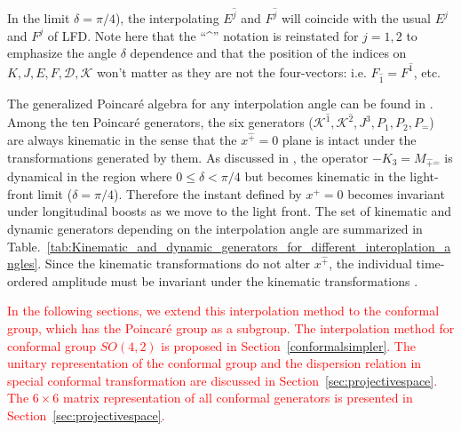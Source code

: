 \documentclass[journal,article,submit,pdftex,moreauthors]{Definitions/mdpi}
\newcommand{\pT}{\hat{+}}
\newcommand{\mT}{\hat{-}}
\newcommand{\itP}[1]{\hat{#1}}
\begin{document}
In the limit $\delta=\pi/4$), the interpolating $E^{\itP{j}}$ and $F^{\itP{j}}$ will coincide with the usual $E^{j}$ and $F^{j}$ of LFD.
Note here that the ``\textasciicircum'' notation is reinstated for $j=1, 2$ to emphasize the angle $\delta$ dependence and that the position of the indices on $K, J, E, F, \mathcal{D}, \mathcal{K}$ won't matter as they are not the four-vectors: i.e. $F_{\itP{1}}=F^{\itP{1}}$, etc.

The generalized Poincar\'e algebra for any interpolation angle can be found in \cite{Ji2001}. 
Among the ten Poincar\'e generators, the six generators ($\mathcal{K}^{\itP{1}}, \mathcal{K}^{\itP{2}}, J^{3}, P_{1}, P_{2}, P_{\mT}$) are always kinematic in the sense that the $x^{\pT}=0$ plane is intact under the transformations generated by them.
As discussed in \cite{Ji2001, Ji2012}, the operator $-K_3=M_{\pT\mT}$ is dynamical in the region where $0\leq\delta<\pi/4$ but becomes kinematic in the light-front limit ($\delta=\pi/4$). Therefore the instant defined by $x^+=0$ becomes invariant under longitudinal boosts as we move to the light front.
The set of kinematic and dynamic generators depending on the interpolation angle are summarized in Table.~\ref{tab:Kinematic_and_dynamic_generators_for_different_interoplation_angles}.
Since the kinematic transformations do not alter $x^{\pT}$, the individual time-ordered amplitude must be invariant under the kinematic transformations \cite{Ji2018QED}.

\textcolor{red}{In the following sections, we extend this interpolation method to the conformal group, which has the Poincar\'e group as a subgroup. The interpolation method for conformal group $SO(4,2)$ is proposed in Section~\ref{conformalsimpler}. The unitary representation of the conformal group and the dispersion relation in special conformal transformation are discussed in Section~\ref{sec:projectivespace}. The $6\times6$ matrix representation of all conformal generators is presented in Section~\ref{sec:projectivespace}. }
\end{document}
